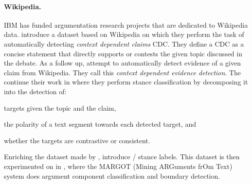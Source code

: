 \paragraph{Wikipedia.} IBM has funded argumentation research projects that are
dedicated to Wikipedia data. \citet{levy2014context} introduce a dataset based
on Wikipedia on which they perform the task of automatically detecting
\emph{context dependent claims} CDC.  They define a CDC as a concise statement
that directly supports or contests the given topic discussed in the debate. As
a follow up, \citet{rinott2015show} attempt to automatically detect evidence of
a given claim from Wikipedia.  They call this \emph{context dependent evidence
detection}.  The continue their work in \citep{bar2017stance} where they
perform stance classification by decomposing it into the detection of: 
\begin{enumerate*}[label=(\arabic*)]
	\item targets given the topic and the claim,
	\item the polarity of a text segment towards each detected target, and
	\item whether the targets are contrastive or consistent. 
\end{enumerate*}
Enriching the dataset made by \citet{levy2014context}, \citet{bar2017stance}
introduce  /  stance labels. This dataset is then experimented on in
\citep{lippi2016margot}, where the MARGOT (Mining ARGuments frOm Text) system
does argument component classification and boundary detection. 


